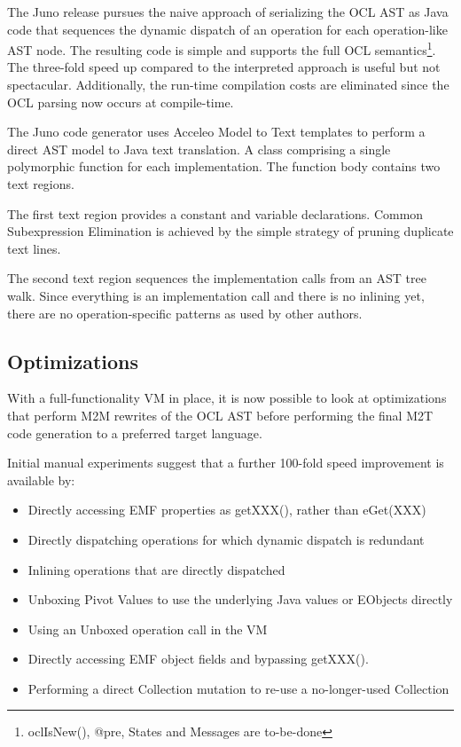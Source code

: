 \documentclass{acm_proc_article-sp}
\begin{document}
The Juno release pursues the naive approach of serializing the OCL AST as Java code that sequences the
dynamic dispatch of an operation for each operation-like AST node. The resulting code is simple and supports the
full OCL semantics\footnote{ oclIsNew(), @pre, States and Messages are to-be-done}. The three-fold speed up compared to the interpreted approach is useful but not spectacular. Additionally, the run-time compilation costs are eliminated since the OCL parsing now occurs at compile-time. 

The Juno code generator uses Acceleo Model to Text templates to perform a direct AST model to Java text translation. A class comprising a single polymorphic function for each implementation. The function body contains two text regions. 

The first text region provides a constant and variable declarations. Common Subexpression Elimination is achieved by the simple strategy of pruning duplicate text lines. 

The second text region sequences the implementation calls from an AST tree walk. Since everything is an implementation call and there is no inlining yet, there are no operation-specific patterns as used by other authors.

\subsection{Optimizations}

With a full-functionality VM in place, it is now possible to look at optimizations that perform M2M rewrites of the OCL AST before performing the final M2T code generation to a preferred target language.

Initial manual experiments suggest that a further 100-fold speed improvement is available by:
\begin{itemize}
\item Directly accessing EMF properties as getXXX(), rather than eGet(XXX) 
\item Directly dispatching operations for which dynamic dispatch is redundant
\item Inlining operations that are directly dispatched
\item Unboxing Pivot Values to use the underlying Java values or EObjects directly
\item Using an Unboxed operation call in the VM 
\item Directly accessing EMF object fields and bypassing getXXX().
\item Performing a direct Collection mutation to re-use a no-longer-used Collection 
\end{itemize}
\end{document}
